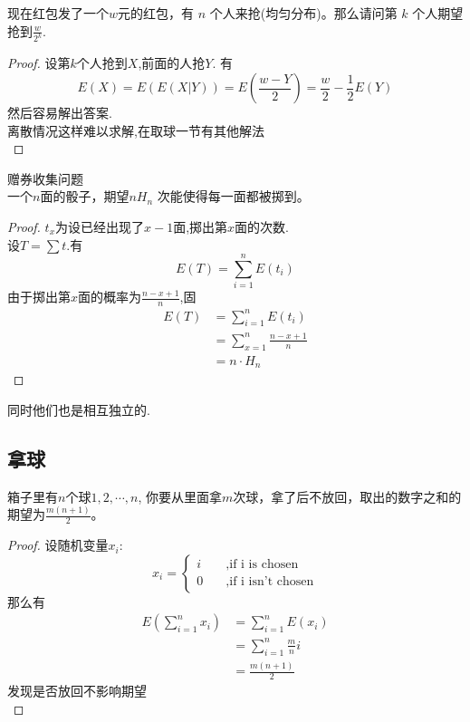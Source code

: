 \begin{proposition}
  现在红包发了一个$w$元的红包，有 $n$ 个人来抢(均匀分布)。那么请问第 $k$ 个人期望抢到$\frac{w}{2^k}$.
\end{proposition}

\begin{proof}
设第$k$个人抢到$X$,前面的人抢$Y$.
有
$$
E(X)=E(E(X|Y))=E(\frac{w-Y}{2})=\frac{w}{2}-\frac{1}{2}E(Y)
$$
然后容易解出答案.\\
离散情况这样难以求解,在取球一节有其他解法\\
\end{proof}

\begin{proposition}赠券收集问题\\
  一个$n$面的骰子，期望$nH_n$ 次能使得每一面都被掷到。
\end{proposition}

\begin{proof}
$t_x$为设已经出现了$x-1$面,掷出第$x$面的次数.\\
设$T=\sum t$.有
$$
E(T)=\sum_{i=1}^{n}E(t_i)
$$
由于掷出第$x$面的概率为$\frac{n-x+1}{n}$,固
$$
\begin{aligned}
  E(T)&=\sum_{i=1}^{n}E(t_i)\\
  &=\sum_{x=1}^{n} \frac{n-x+1}{n}\\
  &=n\cdot H_n
\end{aligned}
$$
\end{proof}
同时他们也是相互独立的.\\


\subsection{拿球}
\begin{proposition}
  箱子里有$n$个球$1,2,⋯,n$, 你要从里面拿$m$次球，拿了后不放回，取出的数字之和的期望为$\frac{m(n+1)}{2}$。
\end{proposition}

\begin{proof}
  设随机变量$x_i$:\\
  $$x_i=\begin{cases}
  i\quad&, \text{if i is chosen}\\
  0\quad&, \text{if i isn't chosen}
  \end{cases}
  $$
  那么有
  $$
  \begin{aligned}
    E\left(\sum_{i=1}^{n}x_i\right)&=\sum_{i=1}^{n}E(x_i)\\
    &=\sum_{i=1}^{n} \frac{m}{n} i\\
    &=\frac{m(n+1)}{2}
  \end{aligned}
  $$
  发现是否放回不影响期望\\
\end{proof}


